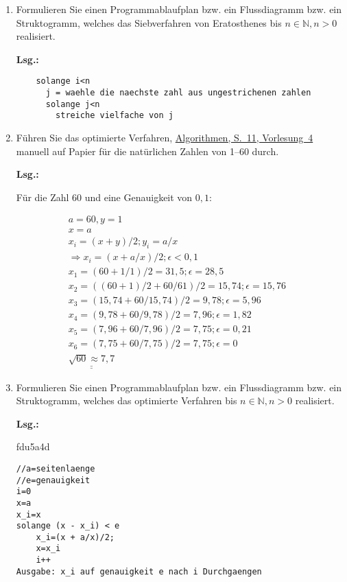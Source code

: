 \documentclass[12pt,a4paper,ngerman]{scrreprt}
\newcommand{\Lsg}{\par \textbf{Lsg.: } \hfill}
\newcommand{\lsg}[1]{\underline{\underline{#1}}}
\begin{document}
\begin{enumerate}
\begin{enumerate}
\item Formulieren Sie einen Programmablaufplan bzw. ein Flussdiagramm bzw. ein Struktogramm, welches das Siebverfahren von Eratosthenes bis $n \in \mathbb{N}, n > 0$ realisiert.

\Lsg

\begin{lstlisting}
    solange i<n
      j = waehle die naechste zahl aus ungestrichenen zahlen
      solange j<n
        streiche vielfache von j
\end{lstlisting}

\item Führen Sie das optimierte Verfahren, \href{run:Algorithmen_Heron_Euklid_Prim.pdf}{Algorithmen, S.~11, Vorlesung~4} manuell auf Papier für die natürlichen Zahlen von \numrange{1}{60} durch.

\Lsg

Für die Zahl $60$ und eine Genauigkeit von $0,1$:

\begin{align*}
a = 60, y = 1 \\
x = a &\\
x_i = (x+y)/2; y_i=a/x \\ \Rightarrow x_i=(x+a/x)/2; \epsilon<0,1 \\ 
x_1 = (60+1/1)/2 = 31,5; \epsilon=28,5 \\
x_2 = ((60+1)/2+60/61)/2 = 15,74; \epsilon=15,76 \\
x_3 = (15,74+60/15,74)/2 = 9,78; \epsilon=5,96 \\
x_4 = (9,78+60/9,78)/2 = 7,96; \epsilon=1,82 \\
x_5 = (7,96+60/7,96)/2 = 7,75; \epsilon=0,21 \\
x_6 = (7,75+60/7,75)/2 = 7,75; \epsilon=0 \\
\lsg{\sqrt{60} \approx 7,7}
\end{align*}

\item Formulieren Sie einen Programmablaufplan bzw. ein Flussdiagramm bzw. ein Struktogramm, welches das optimierte Verfahren bis $n \in \mathbb{N}, n > 0$ realisiert.

\Lsg

{fdu5a4d}

\begin{lstlisting}
//a=seitenlaenge
//e=genauigkeit
i=0
x=a
x_i=x
solange (x - x_i) < e
	x_i=(x + a/x)/2;
	x=x_i
	i++
Ausgabe: x_i auf genauigkeit e nach i Durchgaengen
\end{lstlisting}


\end{enumerate}
\end{enumerate}
\end{document}
